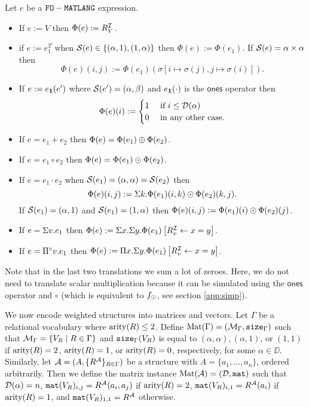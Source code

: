Let $e$ be a $\texttt{FO}-\texttt{MATLANG}$ expression.
\begin{itemize}
  \item If $e:=V$ then $\Phi(e):=R_V^{\mathcal{I}}$.
  \item if $e:= e_1^T$ when $\mathcal{S}(e)\in \{(\alpha,1), (1,\alpha)\}$ then $\Phi(e):=\Phi(e_1)$. If $\mathcal{S}(e)=\alpha\times\alpha$ then
  $$
  \Phi(e)(i,j):=\Phi(e_1)(\sigma\left[ i\mapsto \sigma(j), j\mapsto \sigma(i) \right]).
  $$
  \item If $e:=e_{\mathbf{1}}(e')$ where $\mathcal{S}(e')=(\alpha, \beta)$ and $e_{\mathbf{1}}(\cdot)$ is the $\mathsf{ones}$ operator 
  then
  \[
\Phi(e)(i) := \begin{cases}
1& \text{ if } i\leq\mathcal{D}(\alpha)\ \\
0 & \text{ in any other case.} 
\end{cases}
\]
  \item If $e=e_1+e_2$ then $\Phi(e)=\Phi(e_1)\oplus \Phi(e_2)$.
  \item If $e=e_1\circ e_2$ then $\Phi(e)=\Phi(e_1)\odot \Phi(e_2)$.
  \item If $e=e_1\cdot e_2$ when $\mathcal{S}(e_1)=(\alpha, \alpha)= \mathcal{S}(e_2)$ then 
  $$
  \Phi(e)(i,j):=\Sigma k. \Phi(e_1)(i,k)\odot\Phi(e_2)(k,j). 
  $$
  If $\mathcal{S}(e_1)=(\alpha, 1)$ and $\mathcal{S}(e_1)=(1, \alpha)$ then $\Phi(e)(i,j):=\Phi(e_1)(i)\odot\Phi(e_2)(j)$.
  \item If $e=\Sigma v. e_1$ then $\Phi(e):=\Sigma x.\Sigma y.\Phi(e_1)\left[ R_v^{\mathcal{I}}\gets x=y \right]$.
  \item If $e=\Pi^{\circ} v. e_1$ then $\Phi(e):=\Pi x.\Sigma y.\Phi(e_1)\left[ R_v^{\mathcal{I}}\gets x=y \right]$.
\end{itemize}
Note that in the last two translations we sum a lot of zeroes. Here, we do not need to translate scalar multiplication
because it can be simulated using the $\mathsf{ones}$ operator and $\circ$ (which is equivalent to $f_{\odot}$, see section \ref{app:simp}).

We now encode weighted structures into matrices and vectors. Let $\Gamma$ be a relational vocabulary 
where $\operatorname{arity}(R) \leq 2$. 
Define $\text{Mat}(\Gamma) = (\mathcal{M}_\Gamma,\texttt{size}_\Gamma)$ such 
that $\mathcal{M}_\Gamma = \{ V_{R} \mid R \in \Gamma\}$ and $\texttt{size}_\Gamma(V_{R})$ is equal to 
$(\alpha, \alpha), (\alpha, 1)$, or $(1,1)$ if $\operatorname{arity}(R)=2$, $\operatorname{arity}(R)=1$, or $\operatorname{arity}(R)=0$, 
respectively, for some $\alpha \in \DD$. Similarly, let $\mathcal{A} = (A, \{R^{\mathcal{A}}\}_{R \in \Gamma})$ 
be a structure with $A = \{a_1, \ldots, a_n\}$, ordered arbitrarily.
Then we define the matrix instance $\text{Mat}(\mathcal{A}) = (\mathcal{D},\texttt{mat})$ such that $\mathcal{D}(\alpha) = n$, 
$\texttt{mat}(V_{R})_{i,j} = R^{\mathcal{A}}(a_i, a_j)$ if $\operatorname{arity}(R)=2$, $\texttt{mat}(V_{R})_{i,1} = R^{\mathcal{A}}(a_i)$ if $\operatorname{arity}(R)=1$, 
and $\texttt{mat}(V_{R})_{1,1} = R^{\mathcal{A}}$ otherwise.

